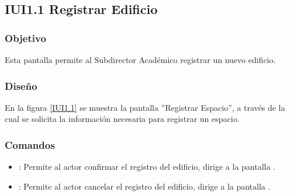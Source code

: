 \subsection{IUI1.1 Registrar Edificio}

\subsubsection{Objetivo}
	Esta pantalla permite al Subdirector Académico registrar un nuevo edificio.

\subsubsection{Diseño}

    En la figura \ref{IUI1.1} se muestra la pantalla ''Registrar Espacio'', a través de la cual se solicita la información necesaria para registrar un espacio.
 

\subsubsection{Comandos}
    \begin{itemize}
	\item {}: Permite al actor confirmar el registro del edificio, dirige a la pantalla .
	
	\item {}: Permite al actor cancelar el registro del edificio, dirige a la pantalla .
    \end{itemize}
